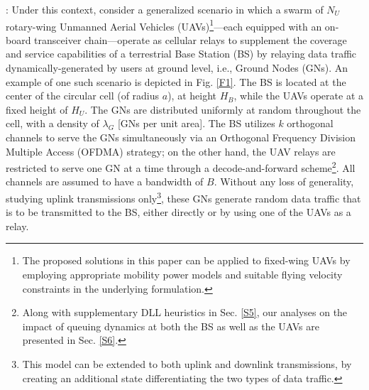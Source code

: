 \documentclass[12pt, draftcls, onecolumn]{IEEEtran}
\theoremstyle{plain}
\theoremstyle{definition}
\theoremstyle{remark}
\begin{document}
: Under this context, consider a generalized scenario in which a swarm of $N_{U}$ rotary-wing Unmanned Aerial Vehicles (UAVs)\footnote{The proposed solutions in this paper can be applied to fixed-wing UAVs \cite{FixedWingUAVs} by employing appropriate mobility power models and suitable flying velocity constraints in the underlying formulation.}---each equipped with an on-board transceiver chain---operate as cellular relays to supplement the coverage and service capabilities of a terrestrial Base Station (BS) by relaying data traffic dynamically-generated by users at ground level, i.e., Ground Nodes (GNs). An example of one such scenario is depicted in Fig. \ref{F1}. The BS is located at the center of the circular cell (of radius $a$), at height $H_{B}$, while the UAVs operate at a fixed height of $H_{U}$. The GNs are distributed uniformly at random throughout the cell, with a density of $\lambda_{G}$ [GNs per unit area]. The BS utilizes $k$ orthogonal channels to serve the GNs simultaneously via an Orthogonal Frequency Division Multiple Access (OFDMA) strategy; on the other hand, the UAV relays are restricted to serve one GN at a time through a decode-and-forward scheme\footnote{Along with supplementary DLL heuristics in Sec. \ref{S5}, our analyses on the impact of queuing dynamics at both the BS as well as the UAVs are presented in Sec. \ref{S6}.}. All channels are assumed to have a bandwidth of $B$. Without any loss of generality, studying uplink transmissions only\footnote{This model can be extended to both uplink and downlink transmissions, by creating an additional state differentiating the two types of data traffic.}, these GNs generate random data traffic that is to be transmitted to the BS, either directly or by using one of the UAVs as a relay.
\end{document}

